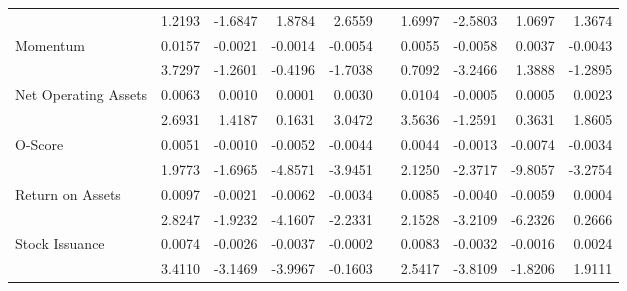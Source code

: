 \begin{table}[htbp]
{\begin{tabular}{lrrrrlrrrr}
& 1.2193 & -1.6847 & 1.8784 & 2.6559 &       & 1.6997 & -2.5803 & 1.0697 & 1.3674 \\
Momentum & 0.0157 & -0.0021 & -0.0014 & -0.0054 &       & 0.0055 & -0.0058 & 0.0037 & -0.0043 \\
& 3.7297 & -1.2601 & -0.4196 & -1.7038 &       & 0.7092 & -3.2466 & 1.3888 & -1.2895 \\
Net Operating Assets & 0.0063 & 0.0010 & 0.0001 & 0.0030 &       & 0.0104 & -0.0005 & 0.0005 & 0.0023 \\
& 2.6931 & 1.4187 & 0.1631 & 3.0472 &       & 3.5636 & -1.2591 & 0.3631 & 1.8605 \\
O-Score & 0.0051 & -0.0010 & -0.0052 & -0.0044 &       & 0.0044 & -0.0013 & -0.0074 & -0.0034 \\
& 1.9773 & -1.6965 & -4.8571 & -3.9451 &       & 2.1250 & -2.3717 & -9.8057 & -3.2754 \\
Return on Assets & 0.0097 & -0.0021 & -0.0062 & -0.0034 &       & 0.0085 & -0.0040 & -0.0059 & 0.0004 \\
& 2.8247 & -1.9232 & -4.1607 & -2.2331 &       & 2.1528 & -3.2109 & -6.2326 & 0.2666 \\
Stock Issuance & 0.0074 & -0.0026 & -0.0037 & -0.0002 &       & 0.0083 & -0.0032 & -0.0016 & 0.0024 \\
& 3.4110 & -3.1469 & -3.9967 & -0.1603 &       & 2.5417 & -3.8109 & -1.8206 & 1.9111 \\
\bottomrule
\end{tabular}%
}
\label{tab:liq-ff3}%
\end{table}%

